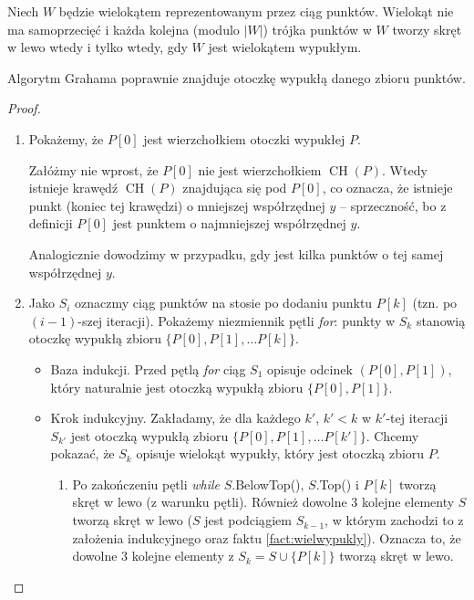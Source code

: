 \begin{fact}
	\label{fact:wielwypukly}
	Niech $W$ będzie wielokątem reprezentowanym przez ciąg punktów. Wielokąt nie ma samoprzecięć i każda kolejna (modulo $|W|$) trójka punktów w $W$ tworzy skręt w lewo wtedy i tylko wtedy, gdy $W$ jest wielokątem wypukłym.
\end{fact}

\begin{theorem}
	Algorytm Grahama poprawnie znajduje otoczkę wypukłą danego zbioru punktów.
	\begin{proof}
		\phantom{a}
		\begin{enumerate}
			\item Pokażemy, że $P[0]$ jest wierzchołkiem otoczki wypukłej $P$. 
			
			Załóżmy nie wprost, że $P[0]$ nie jest wierzchołkiem $\operatorname{CH}(P)$. Wtedy istnieje krawędź $\operatorname{CH}(P)$ znajdująca się pod $P[0]$, co oznacza, że istnieje punkt (koniec tej krawędzi) o mniejszej współrzędnej $y$ -- sprzeczność, bo z definicji $P[0]$ jest punktem o najmniejszej współrzędnej $y$.
			
			Analogicznie dowodzimy w przypadku, gdy jest kilka punktów o tej samej współrzędnej $y$.
			
			\item Jako $S_i$ oznaczmy ciąg punktów na stosie po dodaniu punktu $P[k]$ (tzn. po $(i-1)$-szej iteracji). Pokażemy niezmiennik pętli \textit{for}: punkty w $S_{k}$ stanowią otoczkę wypukłą zbioru $\{P[0], P[1], \dots P[k]\}$.
			
			\begin{itemize}
				\item Baza indukcji. Przed pętlą \textit{for} ciąg $S_1$ opisuje odcinek $(P[0], P[1])$, który naturalnie jest otoczką wypukłą zbioru  $\{P[0], P[1]\}$.
				
				\item Krok indukcyjny. Zakładamy, że dla każdego $k'$, $k'<k$ w $k'$-tej iteracji $S_{k'}$ jest otoczką wypukłą zbioru $\{P[0], P[1], \dots P[k']\}$. 
				Chcemy pokazać, że $S_k$ opisuje wielokąt wypukły, który jest otoczką zbioru $P$.
				
				\begin{enumerate}				
					\item Po zakończeniu pętli \textit{while} $S$.BelowTop(), $S$.Top() i $P[k]$ tworzą skręt w lewo (z warunku pętli). Również dowolne 3 kolejne elementy $S$ tworzą skręt w lewo ($S$ jest podciągiem $S_{k-1}$, w którym zachodzi to z założenia indukcyjnego oraz faktu \ref{fact:wielwypukly}). Oznacza to, że dowolne 3 kolejne elementy z $S_k = S \cup \{P[k]\}$ tworzą skręt w lewo. 
					

\end{enumerate}
\end{itemize}
\end{enumerate}
\end{proof}
\end{theorem}
